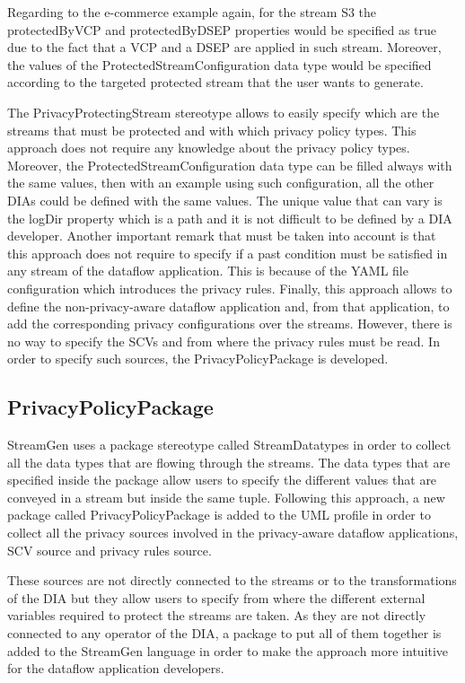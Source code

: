 Regarding to the e-commerce example again, for the stream S3 the protectedByVCP and protectedByDSEP properties would be specified as true due to the fact that a VCP and a DSEP are applied in such stream. Moreover, the values of the ProtectedStreamConfiguration data type would be specified according to the targeted protected stream that the user wants to generate.

The PrivacyProtectingStream stereotype allows to easily specify which are the streams that must be protected and with which privacy policy types. This approach does not require any knowledge about the privacy policy types. Moreover, the ProtectedStreamConfiguration data type can be filled always with the same values, then with an example using such configuration, all the other DIAs could be defined with the same values. The unique value that can vary is the logDir property which is a path and it is not difficult to be defined by a DIA developer. Another important remark that must be taken into account is that this approach does not require to specify if a past condition must be satisfied in any stream of the dataflow application. This is because of the YAML file configuration which introduces the privacy rules. Finally, this approach allows to define the non-privacy-aware dataflow application and, from that application, to add the corresponding privacy configurations over the streams. However, there is no way to specify the SCVs and from where the privacy rules must be read. In order to specify such sources, the PrivacyPolicyPackage is developed.

\subsection{PrivacyPolicyPackage}

StreamGen uses a package stereotype called StreamDatatypes in order to collect all the data types that are flowing through the streams. The data types that are specified inside the package allow users to specify the different values that are conveyed in a stream but inside the same tuple. Following this approach, a new package called PrivacyPolicyPackage is added to the UML profile in order to collect all the privacy sources involved in the privacy-aware dataflow applications, SCV source and privacy rules source.

These sources are not directly connected to the streams or to the transformations of the DIA but they allow users to specify from where the different external variables required to protect the streams are taken. As they are not directly connected to any operator of the DIA, a package to put all of them together is added to the StreamGen language in order to make the approach more intuitive for the dataflow application developers.

